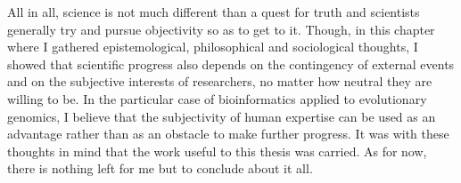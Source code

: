 %
%
%
%
%
%
%

%



All in all, science is not much different than a quest for truth and scientists generally try and pursue objectivity so as to get to it.
Though, in this chapter where I gathered epistemological, philosophical and sociological thoughts, I showed that scientific progress also depends on the contingency of external events and on the subjective interests of researchers, no matter how neutral they are willing to be.
In the particular case of bioinformatics applied to evolutionary genomics, I believe that the subjectivity of human expertise can be used as an advantage rather than as an obstacle to make further progress.
It was with these thoughts in mind that the work useful to this thesis was carried.
As for now, there is nothing left for me but to conclude about it all.



